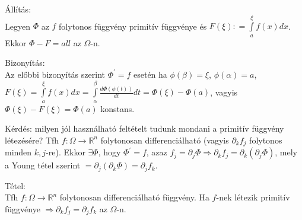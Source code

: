 \documentclass[12pt,a4paper]{scrartcl}
\newenvironment{tetel}{}{}
\newenvironment{bizonyitas}{}{}
\newenvironment{allitas}{}{}
\begin{document}
\begin{allitas}

Állítás:\\
Legyen \(\Phi\) az \(f\) folytonos függvény primitív függvénye és
\(F\left( \xi \right): = {\int\limits_{a}^{\xi}{f\left( x \right)dx}}\).
Ekkor \(\Phi - F = {all}\) az \(\Omega\)-n.

\end{allitas}

\begin{bizonyitas}

Bizonyítás:\\
Az előbbi bizonyítás szerint \(\Phi^{\prime} = f\) esetén ha
\(\phi\left( \beta \right) = \xi\), \(\phi\left( \alpha \right) = a\),
\(F\left( \xi \right) = {\int\limits_{a}^{\xi}{f\left( x \right)dx}} = {\int\limits_{\alpha}^{\beta}{\frac{d\Phi\left( {\phi\left( t \right)} \right)}{dt}dt = \Phi\left( \xi \right) - \Phi\left( a \right)}}\),
vagyis
\(\Phi\left( \xi \right) - F\left( \xi \right) = \Phi\left( a \right)\)
konstans.

\end{bizonyitas}

Kérdés: milyen jól használható feltételt tudunk mondani a primitív
függvény létezésére? Tfh
\(\left. f:\Omega\rightarrow{\mathbb{R}}^{n} \right.\) folytonosan
differenciálható (vagyis \(\partial_{k}f_{j}\) folytonos minden
\(k,j\)-re). Ekkor \(\exists\Phi\), hogy \(\Phi^{\prime} = f\), azaz
\(\left. f_{j} = \partial_{j}\Phi\Rightarrow\partial_{k}f_{j} = \partial_{k}\left( {\partial_{j}\Phi} \right) \right.\),
mely a Young tétel szerint
\(= \partial_{j}\left( {\partial_{k}\Phi} \right) = \partial_{j}f_{k}\).

\begin{tetel}

Tétel:\\
Tfh \(\left. f:\Omega\rightarrow{\mathbb{R}}^{n} \right.\) folytonosan
differenciálható függvény. Ha \(f\)-nek létezik primitív függvénye
\(\left. \Rightarrow\partial_{k}f_{j} = \partial_{j}f_{k} \right.\) az
\(\Omega\)-n.

\end{tetel}
\end{document}
